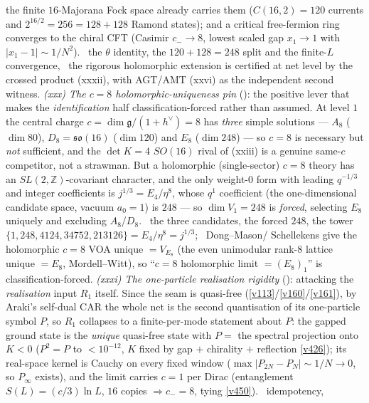 the finite $16$-Majorana Fock space already carries them ($C(16,2){=}120$ currents and $2^{16/2}{=}256{=}128{+}128$
Ramond states); and a critical free-fermion ring converges to the chiral CFT (Casimir $c_-{\to}8$, lowest scaled
gap $x_1{\to}1$ with $|x_1{-}1|{\sim}1/N^2$). \mE\ the $\theta$ identity, the $120{+}128{=}248$ split and the
finite-$L$ convergence, \mC\mO\ the rigorous holomorphic extension is certified at net level by the crossed
product (xxxii), with AGT/AMT (xxvi) as the independent second witness. \emph{(xxx) The $c{=}8$
holomorphic-uniqueness pin} (): the positive lever that makes the
\emph{identification} half classification-forced rather than assumed. At level $1$ the central charge
$c{=}\dim\mathfrak g/(1{+}h^\vee){=}8$ has \emph{three} simple solutions --- $A_8$ ($\dim 80$), $D_8{=}\mathfrak{so}(16)$
($\dim 120$) and $E_8$ ($\dim 248$) --- so $c{=}8$ is necessary but \emph{not} sufficient, and the $\det K{=}4$
$SO(16)$ rival of (xxiii) is a genuine same-$c$ competitor, not a strawman. But a holomorphic (single-sector) $c{=}8$
theory has an $SL(2,\mathbb Z)$-covariant character, and the only weight-$0$ form with leading $q^{-1/3}$ and integer
coefficients is $j^{1/3}{=}E_4/\eta^8$, whose $q^1$ coefficient (the one-dimensional candidate space, vacuum $a_0{=}1$)
is $248$ --- so $\dim V_1{=}248$ is \emph{forced}, selecting $E_8$ uniquely and excluding $A_8$/$D_8$. \mE\ the three
candidates, the forced $248$, the tower $\{1,248,4124,34752,213126\}{=}E_4/\eta^8{=}j^{1/3}$; \mC\ Dong--Mason/
Schellekens give the holomorphic $c{=}8$ VOA unique $={}V_{E_8}$ (the even unimodular rank-$8$ lattice unique $={}E_8$,
Mordell--Witt), so ``$c{=}8$ holomorphic limit $={}(E_8)_1$'' is classification-forced. \emph{(xxxi) The one-particle
realisation rigidity} (): attacking the \emph{realisation} input $R_1$
itself. Since the seam is quasi-free (\vref{v113}/\vref{v160}/\vref{v161}), by Araki's self-dual CAR the whole net is
the second quantisation of its one-particle symbol $P$, so $R_1$ collapses to a finite-per-mode statement about $P$:
the gapped ground state is the \emph{unique} quasi-free state with $P{=}$ the spectral projection onto $K{<}0$
($P^2{=}P$ to $<10^{-12}$, $K$ fixed by gap $+$ chirality $+$ reflection \vref{v426}); its real-space kernel is Cauchy
on every fixed window ($\max|P_{2N}{-}P_N|{\sim}1/N{\to}0$, so $P_\infty$ exists), and the limit carries $c{=}1$ per
Dirac (entanglement $S(L){=}(c/3)\ln L$, $16$ copies $\Rightarrow c_-{=}8$, tying \vref{v450}). \mE\ idempotency,
